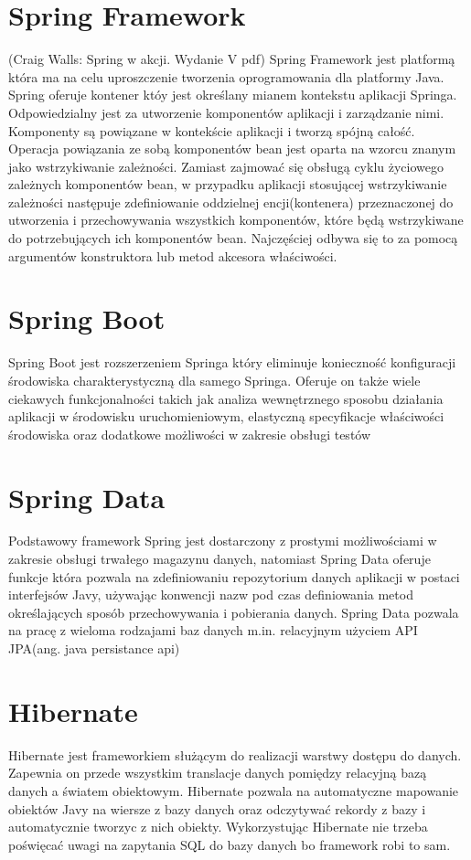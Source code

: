 \section{Spring Framework}
(Craig Walls: Spring w akcji. Wydanie V pdf)
Spring Framework jest platformą która ma na celu uproszczenie tworzenia oprogramowania dla platformy Java. Spring oferuje kontener któy jest określany mianem kontekstu aplikacji Springa. Odpowiedzialny jest za utworzenie komponentów aplikacji i zarządzanie nimi. Komponenty są powiązane w kontekście aplikacji i tworzą spójną całość. Operacja powiązania ze sobą komponentów bean jest oparta na wzorcu znanym jako wstrzykiwanie zależności. Zamiast zajmować się obsługą cyklu życiowego zależnych komponentów bean, w przypadku aplikacji stosującej wstrzykiwanie zależności następuje zdefiniowanie oddzielnej encji(kontenera) przeznaczonej do utworzenia i przechowywania wszystkich komponentów, które będą wstrzykiwane do potrzebujących ich komponentów bean. Najczęściej odbywa się to za pomocą argumentów konstruktora lub metod akcesora właściwości. 
\section{Spring Boot}
Spring Boot jest rozszerzeniem Springa który eliminuje konieczność konfiguracji środowiska charakterystyczną dla samego Springa. Oferuje on także wiele ciekawych funkcjonalności takich jak analiza wewnętrznego sposobu działania aplikacji w środowisku uruchomieniowym, elastyczną specyfikacje właściwości środowiska oraz dodatkowe możliwości w zakresie obsługi testów
\section{Spring Data}
Podstawowy framework Spring jest dostarczony z prostymi możliwościami w zakresie obsługi trwałego magazynu danych, natomiast Spring Data oferuje funkcje która pozwala na zdefiniowaniu repozytorium danych aplikacji w postaci interfejsów Javy, używając konwencji nazw pod czas definiowania metod określających sposób przechowywania i pobierania danych. Spring Data pozwala na pracę z wieloma rodzajami baz danych m.in. relacyjnym użyciem API JPA(ang. java persistance api)
\section{Hibernate}
Hibernate jest frameworkiem służącym do realizacji warstwy dostępu do danych. Zapewnia on przede wszystkim translacje danych pomiędzy relacyjną bazą danych a światem obiektowym. Hibernate pozwala na automatyczne mapowanie obiektów Javy na wiersze z bazy danych oraz odczytywać rekordy z bazy i automatycznie tworzyc z nich obiekty. Wykorzystując Hibernate nie trzeba poświęcać uwagi na zapytania SQL do bazy danych bo framework robi to sam.


